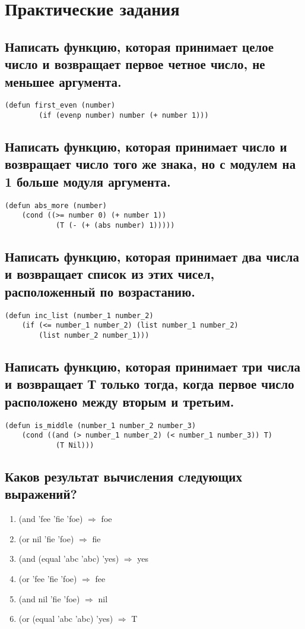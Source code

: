 \chapter{Практические задания}
\section{Написать функцию, которая принимает целое число и возвращает первое четное число, не меньшее аргумента.}
\begin{lstlisting}[caption=Задание 1]
	(defun first_even (number)
		(if (evenp number) number (+ number 1)))
\end{lstlisting}

\section{Написать функцию, которая принимает число и возвращает число того же знака, но с модулем на 1 больше модуля аргумента.}
\begin{lstlisting}[caption=Задание 2]
(defun abs_more (number)
	(cond ((>= number 0) (+ number 1))
			(T (- (+ (abs number) 1)))))
\end{lstlisting}

\section{Написать функцию, которая принимает два числа и возвращает	список из этих чисел, расположенный по возрастанию.}
\begin{lstlisting}[caption=Задание 3]
(defun inc_list (number_1 number_2) 
	(if (<= number_1 number_2) (list number_1 number_2) 
		(list number_2 number_1)))
\end{lstlisting}

\section{Написать функцию, которая принимает три числа и возвращает Т только тогда, когда первое число расположено между вторым и третьим.}
\begin{lstlisting}[caption=Задание 4]
(defun is_middle (number_1 number_2 number_3)
	(cond ((and (> number_1 number_2) (< number_1 number_3)) T)
			(T Nil)))
\end{lstlisting}

\section{Каков результат вычисления следующих выражений?}
\begin{enumerate}
	\item (and 'fee 'fie 'foe) $\Rightarrow$ foe
	\item (or nil 'fie 'foe) $\Rightarrow$ fie
	\item (and (equal 'abc 'abc) 'yes) $\Rightarrow$ yes
	\item (or 'fee 'fie 'foe) $\Rightarrow$ fee
	\item (and nil 'fie 'foe) $\Rightarrow$ nil
	\item (or (equal 'abc 'abc) 'yes) $\Rightarrow$ T
\end{enumerate}

